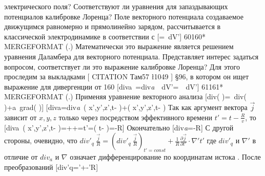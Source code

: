 \documentclass[11pt]{article}
\begin{document}
{электрического поля? Соответствуют ли уравнения для запаздывающих
потенциалов калибровке Лоренца? Поле векторного потенциала создаваемое
движущимся равномерно и прямолинейно зарядом, рассчитывается в
классической электродинамике в соответствии с
{[}=~dV'{]}
60160* MERGEFORMAT (.) Математически это выражение является решением
уравнения Даламбера для векторного потенциала. Представляет интерес
задаться вопросом, соответствует ли это выражение калибровке Лоренца?
Для этого проследим за выкладками {[} CITATION Там57 \l 1049 {]} §96, в
котором он ищет выражение для дивергенции от 160
{[}di{{v}}{a}}~=di{{v}\emph{{a}}~~dV'=~~dV'{]}
61161* MERGEFORMAT (.) Применяя уравнение векторного анализа
{[}div\left( \varphi {} \right)=\varphi ~div\left(
 \right)+a~grad\left( \varphi  \right){]}
{[}di{{v}}{a}}=\cdot di{{v}\emph{{a}}~\left(
x',y',z',t- \right)+\left(
x',y',z',t- \right)\cdot \nabla \frac{1}{R}{]} Так как
аргумент вектора \(\overrightarrow{j}\) зависит от \(x,y,z\) только
через посредством эффективного времени \(t'=t-\frac{R}{v}\), то
{[}di{{v}}{a}}~\left( x',y',z',t-
\right)=++=\cdot \nabla t'=\cdot \nabla \left(
t-
\right)=-\cdot \nabla R{]}
Окончательно
{[}di{{v}\emph{{a}}=\cdot \nabla {}-\cdot \nabla R{]}
С другой стороны, очевидно, что
\(div{{'}_{q}}\ \frac{\overrightarrow{j}}{R}={{\left( div{{'}_{q}}\ \frac{\overrightarrow{j}}{R} \right)}_{t'=const}}+\frac{1}{R}\frac{\partial \overrightarrow{j}}{\partial t'}\cdot \nabla 't'\)
где \(div{{'}_{q}}\) и \(\nabla '\) в отличие от \(di{{v}_{a}}\) и
$\nabla $ означает дифференцирование по координатам истока . После
преобразований
{[}div{{'}}{q}}=\cdot \nabla '+-\cdot \nabla 'R{]}
\end{document}
